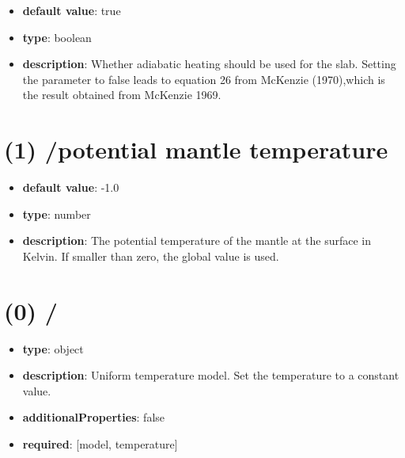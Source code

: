 \begin{itemize}[leftmargin=1em]\item {\bf default value}: true
\item {\bf type}: boolean
\item {\bf description}: Whether adiabatic heating should be used for the slab. Setting the parameter to false leads to equation 26 from McKenzie (1970),which is the result obtained from McKenzie 1969.
\end{itemize}\section{(1) /potential mantle temperature}
\begin{itemize}[leftmargin=1em]\item {\bf default value}: -1.0
\item {\bf type}: number
\item {\bf description}: The potential temperature of the mantle at the surface in Kelvin. If smaller than zero, the global value is used.
\end{itemize}\section{(0) /}
\begin{itemize}[leftmargin=0em]\item {\bf type}: object
\item {\bf description}: Uniform temperature model. Set the temperature to a constant value.
\item {\bf additionalProperties}: false
\item {\bf required}: [model, temperature]\end{itemize}
